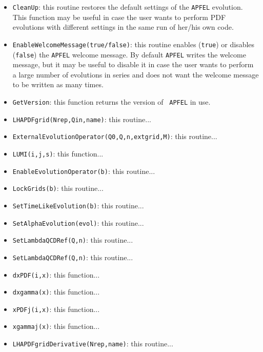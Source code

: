 \documentclass[11pt,a4paper]{article}
\begin{document}
\begin{itemize}
\item{\tt CleanUp}: this routine restores the default settings of the
  {\tt APFEL} evolution. This function may be useful in case the user
  wants to perform PDF evolutions with different settings in the same run
  of her/his own code.

\item{\tt EnableWelcomeMessage(true/false)}: this routine enables
  ({\tt true}) or disables ({\tt false}) the {\tt APFEL} welcome
  message. By default {\tt APFEL} writes the welcome message, but it
  may be useful to disable it in case the user wants to perform a
  large number of evolutions in series and does not want the welcome
  message to be written as many times.

\item{\tt GetVersion}: this function returns the version of {\tt
    APFEL} in use.

\item{\tt LHAPDFgrid(Nrep,Qin,name)}: this routine...

\item{\tt ExternalEvolutionOperator(Q0,Q,n,extgrid,M)}: this routine...

\item{\tt LUMI(i,j,s)}: this function...

\item{\tt EnableEvolutionOperator(b)}: this routine...

\item{\tt LockGrids(b)}: this routine...

\item{\tt SetTimeLikeEvolution(b)}: this routine...

\item{\tt SetAlphaEvolution(evol)}: this routine...

\item{\tt SetLambdaQCDRef(Q,n)}: this routine...

\item{\tt SetLambdaQCDRef(Q,n)}: this routine...

\item{\tt dxPDF(i,x)}: this function...

\item{\tt dxgamma(x)}: this function...

\item{\tt xPDFj(i,x)}: this function...

\item{\tt xgammaj(x)}: this function...

\item{\tt LHAPDFgridDerivative(Nrep,name)}: this routine...

\end{itemize}
\end{document}
